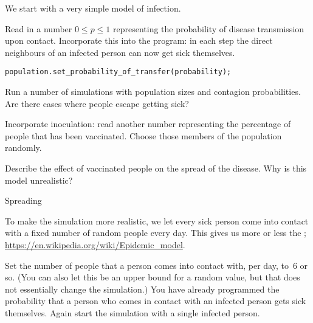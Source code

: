 We start with a very simple model of infection.

\begin{exercise}
  \label{ex:infect:1}
  Read in a number $0\leq p \leq 1$ representing the probability of
  disease transmission upon contact. Incorporate this into the
  program: in each step the direct neighbours of an infected person
  can now get sick themselves.
\begin{lstlisting}
population.set_probability_of_transfer(probability);  
\end{lstlisting}
  Run a number of simulations with population sizes and contagion
  probabilities. Are there cases where people escape getting sick?
\end{exercise}

\begin{exercise}
  \label{ex:infect:2}
  Incorporate inoculation: read another number representing the
  percentage of people that has been vaccinated. Choose those members
  of the population randomly.

  Describe the effect of vaccinated people on the spread of the
  disease. Why is this model unrealistic?
\end{exercise}

 {Spreading}

To make the simulation more realistic, we let every sick person come
into contact with a fixed number of random people every day. This
gives us more or less the ;
\url{https://en.wikipedia.org/wiki/Epidemic_model}.

Set the number of people that a person comes into contact with, per
day, to~6 or so. (You can also let this be an upper bound for a random
value, but that
does not essentially change the simulation.) You have already programmed the probability that a
person who comes in contact with an infected person gets sick themselves.
Again start the simulation with a single infected person.

